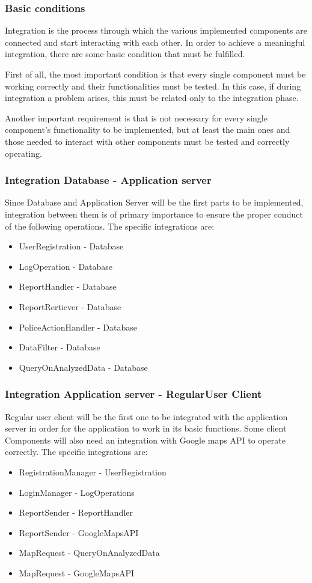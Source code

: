 \subsubsection{Basic conditions}
Integration is the process through which the various implemented components are connected and start interacting with each other.
In order to achieve a meaningful integration, there are some basic condition that must be fulfilled. \par
First of all, the most important condition is that every single component must be working correctly and their functionalities must be tested. In this case, if during integration a problem arises, this must be related only to the integration phase. \par
Another important requirement is that is not necessary for every single component's functionality to be implemented, but at least the main ones and those needed to interact with other components must be tested and correctly operating.

\subsubsection{Integration Database - Application server}
Since Database and Application Server will be the first parts to be implemented, integration between them is of primary importance to ensure the proper conduct of the following operations.
The specific integrations are:
\begin{itemize}
	\item UserRegistration - Database
	\item LogOperation - Database
	\item ReportHandler - Database
	\item ReportRertiever - Database
	\item PoliceActionHandler - Database
	\item DataFilter - Database
	\item QueryOnAnalyzedData - Database
\end{itemize}

\subsubsection{Integration Application server - RegularUser Client}
Regular user client will be the first one to be integrated with the application server in order for the application to work in its basic functions.
Some client Components will also need an integration with Google maps API to operate correctly.
The specific integrations are:
\begin{itemize}
	\item RegistrationManager - UserRegistration
	\item LoginManager - LogOperations
	\item ReportSender - ReportHandler
	\item ReportSender - GoogleMapsAPI
	\item MapRequest - QueryOnAnalyzedData
	\item MapRequest - GoogleMapsAPI
\end{itemize}


